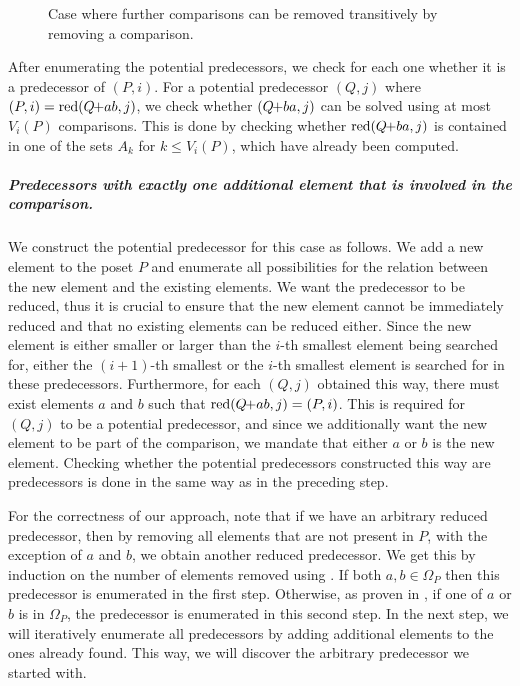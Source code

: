 \documentclass[a4paper,UKenglish,cleveref, autoref, thm-restate]{lipics-v2021}
\newcommand{\pchild}[3]{{#1}\kern-1pt{+}{#2}{#3}}
\newcommand{\reduced}[1]{\operatorname{red}#1}
\begin{document}
\begin{figure}[!b]
  \centering
  
  \caption{Case where further comparisons can be removed transitively by removing a comparison.}
  \label{fig:backward_problematic}
\end{figure}

After enumerating the potential predecessors, we check for each one whether it is a predecessor of $(P, i)$.
For a potential predecessor $(Q, j)$ where $(P, i) = \reduced{(\pchild{Q}{a}{b}, j)}$, we check whether $(\pchild{Q}{b}{a}, j)$ can be solved using at most $V_i(P)$ comparisons.
This is done by checking whether $\reduced{(\pchild{Q}{b}{a}, j)}$ is contained in one of the sets $A_k$ for $k \leq V_i(P)$, which have already been computed.


\subparagraph{Predecessors with exactly one additional element that is involved in the comparison.}
We construct the potential predecessor for this case as follows.
We add a new element to the poset $P$ and enumerate all possibilities for the relation between the new element and the existing elements.
We want the predecessor to be reduced, thus it is crucial to ensure that the new element cannot be immediately reduced and that no existing elements can be reduced either.
Since the new element is either smaller or larger than the $i$-th smallest element being searched for, either the $(i + 1)$-th smallest or the $i$-th smallest element is searched for in these predecessors.
Furthermore, for each $(Q, j)$ obtained this way, there must exist elements $a$ and $b$ such that $\reduced{(\pchild{Q}{a}{b}, j)} = (P, i)$.
This is required for $(Q, j)$ to be a potential predecessor, and since we additionally want the new element to be part of the comparison, we mandate that either $a$ or $b$ is the new element.
Checking whether the potential predecessors constructed this way are predecessors is done in the same way as in the preceding step.

For the correctness of our approach, note that if we have an arbitrary reduced predecessor, then by removing all elements that are not present in $P$, with the exception of $a$ and $b$, we obtain another reduced predecessor.
We get this by induction on the number of elements removed using .
If both $a, b \in \Omega_P$ then this predecessor is enumerated in the first step.
Otherwise, as proven in , if one of $a$ or $b$ is in $\Omega_P$, the predecessor is enumerated in this second step.
In the next step, we will iteratively enumerate all predecessors by adding additional elements to the ones already found.
This way, we will discover the arbitrary predecessor we started with.
\end{document}
